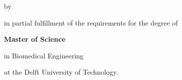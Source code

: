 \begin{titlepage}

    \begin{center}
    
    
    \vspace*{2\bigskipamount}
    
    {\makeatletter
    \titlestyle\color{tudelft-cyan}\Huge\@title
    \makeatother}
    
    {\makeatletter
    \ifx\@subtitle\undefined\else
        \bigskip
        \titlefont\titleshape\LARGE\@subtitle
    \fi
    \makeatother}
    
    \bigskip
    \bigskip
    
    by
    
    \bigskip
    \bigskip
    
    {\makeatletter
    \titlefont\Large\bfseries\@author
    \makeatother}
    
    \vfill
    
    in partial fulfillment of the requirements for the degree of
    
    \bigskip
    \bigskip
    
    {\bfseries Master of Science}
    
    in Biomedical Engineering
    
    \bigskip
    \bigskip
    
    at the Delft University of Technology.
    
    

\end{center}
\end{titlepage}
